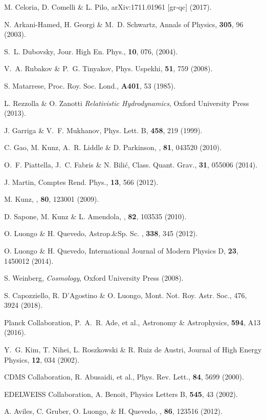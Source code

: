 \documentclass[twocolumn,showpacs, nofootinbib,aps,superscriptaddress, eqsecnum,prd,prl,notitlepage,showkeys,10pt,reprint]{revtex4-1}
\def\mnras{Mont. Not. Roy. Astr. Soc.}
\def\aap{Astronomy \& Astrophysics}
\def\apss{Astrop.\&Sp. Sc. }
\begin{document}
\begin{thebibliography}{37}
%
M. Celoria, D. Comelli \& L. Pilo, arXiv:1711.01961 [gr-qc] (2017).

N. Arkani-Hamed, H. Georgi \& M.~D. Schwartz, Annals of Physics, \textbf{305}, 96 (2003).

S.~L. Dubovsky, Jour. High En. Phys., \textbf{10}, 076, (2004).

V.~A. Rubakov \& P.~G. Tinyakov, Phys. Uspekhi, \textbf{51}, 759 (2008).

S. Matarrese, Proc. Roy. Soc. Lond., \textbf{A401}, 53 (1985).

L. Rezzolla \& O. Zanotti \textit{Relativistic Hydrodynamics}, Oxford University Press (2013).

J. Garriga \& V.~F. Mukhanov, Phys. Lett. B, \textbf{458}, 219 (1999).

C. Gao, M. Kunz, A.~R. Liddle \& D. Parkinson, \prd, \textbf{81}, 043520 (2010).

O.~F. Piattella, J.~C. Fabris \& N. Bili{\'c}, Class. Quant. Grav., \textbf{31}, 055006 (2014).

%
J. Martin, Comptes Rend. Phys., \textbf{13}, 566 (2012).

%
M. Kunz, \prd, \textbf{80}, 123001 (2009).

%
D. Sapone, M. Kunz \& L. Amendola, \prd, \textbf{82}, 103535 (2010).

O. Luongo \& H. Quevedo, \apss, \textbf{338}, 345 (2012).

O. Luongo \& H. Quevedo, International Journal of Modern Physics D, \textbf{23}, 1450012 (2014).

S. Weinberg, \textit{Cosmology}, Oxford University Press (2008).

S. Capozziello, R. D'Agostino \& O. Luongo, \mnras, 476, 3924 (2018).

Planck Collaboration, P.~A.~R. Ade, et al., \aap, \textbf{594}, A13 (2016).

Y.~G. Kim, T. Nihei, L. Roszkowski \& R. Ruiz de Austri, Journal of High Energy Physics, \textbf{12}, 034 (2002).

CDMS Collaboration, R. Abusaidi, et al., Phys. Rev. Lett., \textbf{84}, 5699 (2000).

EDELWEISS Collaboration, A. Benoit, Physics Letters B, \textbf{545}, 43 (2002).

A. Aviles, C. Gruber, O. Luongo, \& H. Quevedo, \prd, \textbf{86}, 123516 (2012).

\end{thebibliography}%
\end{document}
